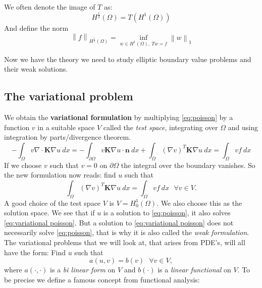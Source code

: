 \documentclass[../Main/main.tex]{subfiles}
\begin{document}
	\begin{remark}
		We often denote the image of $T$ as:
		\begin{equation*}
			 H^{\frac{1}{2}}(\Omega) = T(H^1(\Omega))
		\end{equation*}
		And define the norm
		\begin{equation*}
			\left \|f\right \|_{H^{\frac{1}{2}}(\Omega)} = \inf_{w\in H^1(\Omega), \ Tw=f} \left \| w \right \|_1
		\end{equation*}
	\end{remark}
	Now we have the theory we need to study elliptic boundary value problems and their weak solutions.
	\subsection*{The variational problem}
	We obtain the \textbf{variational formulation} by multiplying \eqref{eq:poisson} by a function $v$ in a suitable space $V$ called the \emph{test space}, integrating over $\Omega$ and using integration by parts/divergence theorem.
	\begin{equation*}
		-\int_{\Omega}v\nabla \cdot\bm{K}\nabla u \ dx = -\int_{\partial \Omega}v \bm{K}\nabla u \cdot \bm{n} \ dx + \int_{\Omega}(\nabla v)^{T}\bm{K} \nabla u \ dx = \int_{\Omega}vf\ dx
	\end{equation*}
	If we choose $v$ such that $v=0$ on $\partial \Omega$ the integral over the boundary vanishes. So the new formulation now reads: find $u$ such that 
	\begin{equation}\label{eq:variational poisson}
			 \int_{\Omega}(\nabla v)^T \bm{K} \nabla u \ dx = \int_{\Omega}vf\ dx \ \ \  \forall v \in V.
	\end{equation}
	A good choice of the test space $V$ is $V=H_0^1(\Omega)$. We also choose this as the solution space.
	We see that if $u$ is a solution to \eqref{eq:poisson}, it also solves \eqref{eq:variational poisson}. But a solution to \eqref{eq:variational poisson} does not necessarily solve \eqref{eq:poisson}, that is why it is also called the \emph{weak formulation}.\\
	The variational problems that we will look at, that arises from PDE's, will all have the form: Find $u$ such that
	\begin{equation}\label{eq:variational problem}
			a(u,v) = b(v) \ \ \ \forall v \in V,
	\end{equation}
	where $a(\cdot,\cdot)$ is a \emph{bi linear form} on $V$ and $b(\cdot)$ is a \emph{linear functional} on $V$. To be precise we define a famous concept from functional analysis:
\end{document}
